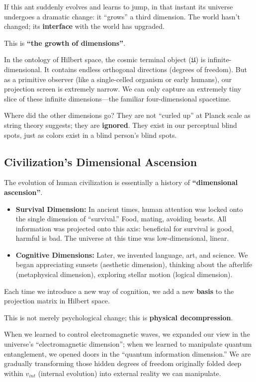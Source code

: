\documentclass[11pt,a4paper,twoside]{book}
\begin{document}
If this ant suddenly evolves and learns to jump, in that instant its universe undergoes a dramatic change: it ``grows'' a third dimension. The world hasn't changed; its \textbf{interface} with the world has upgraded.

This is \textbf{``the growth of dimensions''}.

In the ontology of Hilbert space, the cosmic terminal object ($\mathfrak U$) is infinite-dimensional. It contains endless orthogonal directions (degrees of freedom). But as a primitive observer (like a single-celled organism or early humans), our projection screen is extremely narrow. We can only capture an extremely tiny slice of these infinite dimensions---the familiar four-dimensional spacetime.

Where did the other dimensions go? They are not ``curled up'' at Planck scale as string theory suggests; they are \textbf{ignored}. They exist in our perceptual blind spots, just as colors exist in a blind person's blind spots.

\subsection{Civilization's Dimensional Ascension}

The evolution of human civilization is essentially a history of \textbf{``dimensional ascension''}.

\begin{itemize}
\item \textbf{Survival Dimension:} In ancient times, human attention was locked onto the single dimension of ``survival.'' Food, mating, avoiding beasts. All information was projected onto this axis: beneficial for survival is good, harmful is bad. The universe at this time was low-dimensional, linear.

\item \textbf{Cognitive Dimensions:} Later, we invented language, art, and science. We began appreciating sunsets (aesthetic dimension), thinking about the afterlife (metaphysical dimension), exploring stellar motion (logical dimension).
\end{itemize}

Each time we introduce a new way of cognition, we add a new \textbf{basis} to the projection matrix in Hilbert space.

This is not merely psychological change; this is \textbf{physical decompression}.

When we learned to control electromagnetic waves, we expanded our view in the universe's ``electromagnetic dimension''; when we learned to manipulate quantum entanglement, we opened doors in the ``quantum information dimension.'' We are gradually transforming those hidden degrees of freedom originally folded deep within $v_{int}$ (internal evolution) into external reality we can manipulate.
\end{document}
